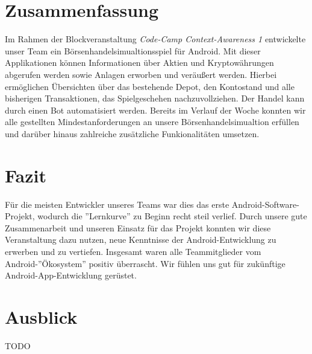 \documentclass[a4paper]{article}
\begin{document}
\section{Zusammenfassung}
\label{sec:summary}
Im Rahmen der Blockveranstaltung \textit{Code-Camp Context-Awareness 1} entwickelte unser Team ein Börsenhandelsimualtionsspiel für Android. Mit dieser Applikationen können Informationen über Aktien und Kryptowährungen abgerufen werden sowie Anlagen erworben und veräußert werden. Hierbei ermöglichen Übersichten über das bestehende Depot, den Kontostand und alle bisherigen Transaktionen, das Spielgeschehen nachzuvollziehen. Der Handel kann durch einen Bot automatisiert werden. \newline
Bereits im Verlauf der Woche konnten wir alle gestellten Mindestanforderungen an unsere Börsenhandelsimualtion erfüllen und darüber hinaus zahlreiche zusätzliche Funkionalitäten umsetzen.


\section{Fazit}
\label{sec:conclusion}
Für die meisten Entwickler unseres Teams war dies das erste Android-Software-Projekt, wodurch die ''Lernkurve'' zu Beginn recht steil verlief. Durch unsere gute Zusammenarbeit und unseren Einsatz für das Projekt konnten wir diese Veranstaltung dazu nutzen, neue Kenntnisse der Android-Entwicklung zu erwerben und zu vertiefen. Insgesamt waren alle Teammitglieder vom Android-''Ökosystem'' positiv überrascht. Wir fühlen uns gut für zukünftige Android-App-Entwicklung gerüstet.


\section{Ausblick}
\label{sec:outlook}
TODO


\printbibliography[title={Referenzen}]
\end{document}
